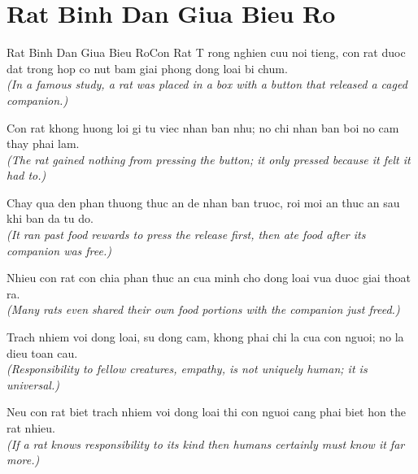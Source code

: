 \section{Rat Binh Dan Giua Bieu Ro}
\begin{truyen}{Rat Binh Dan Giua Bieu Ro}{Con Rat}
T rong nghien cuu noi tieng, con rat duoc dat trong hop co nut bam giai phong dong loai bi chum.\\
\textit{(In a famous study, a rat was placed in a box with a button that released a caged companion.)}

Con rat khong huong loi gi tu viec nhan ban nhu; no chi nhan ban boi no cam thay phai lam.\\
\textit{(The rat gained nothing from pressing the button; it only pressed because it felt it had to.)}

Chay qua den phan thuong thuc an de nhan ban truoc, roi moi an thuc an sau khi ban da tu do.\\
\textit{(It ran past food rewards to press the release first, then ate food after its companion was free.)}

Nhieu con rat con chia phan thuc an cua minh cho dong loai vua duoc giai thoat ra.\\
\textit{(Many rats even shared their own food portions with the companion just freed.)}

Trach nhiem voi dong loai, su dong cam, khong phai chi la cua con nguoi; no la dieu toan cau.\\
\textit{(Responsibility to fellow creatures, empathy, is not uniquely human; it is universal.)}

\end{truyen}
\begin{baihoc}
  Neu con rat biet trach nhiem voi dong loai thi con nguoi cang phai biet hon the rat nhieu.\\
  \textit{(If a rat knows responsibility to its kind then humans certainly must know it far more.)}
\end{baihoc}

